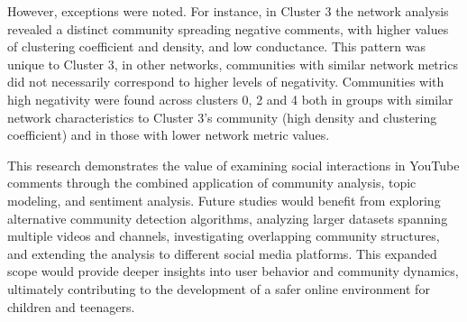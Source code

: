 \documentclass[12pt]{article}
\begin{document}
However, exceptions were noted. For instance, in Cluster 3 the network analysis revealed a distinct 
community spreading negative comments, with higher values of clustering coefficient and density, and low conductance.
This pattern was unique to Cluster 3, in other networks, communities with similar network metrics 
did not necessarily correspond to higher levels of negativity. 
Communities with high negativity were found across clusters 0, 2 and 4 both in groups with similar network 
characteristics to Cluster 3's community (high density and clustering coefficient) and in those with 
lower network metric values. 
    
This research demonstrates the value of examining social interactions in YouTube comments through the 
combined application of community analysis, topic modeling, and sentiment analysis. Future studies would benefit 
from exploring alternative community detection algorithms, analyzing larger datasets spanning 
multiple videos and channels, investigating overlapping community structures, and extending the analysis to 
different social media platforms. This expanded scope would provide deeper insights into 
user behavior and community dynamics, ultimately contributing to the development of a  safer online 
environment for children and teenagers.



\end{document}
